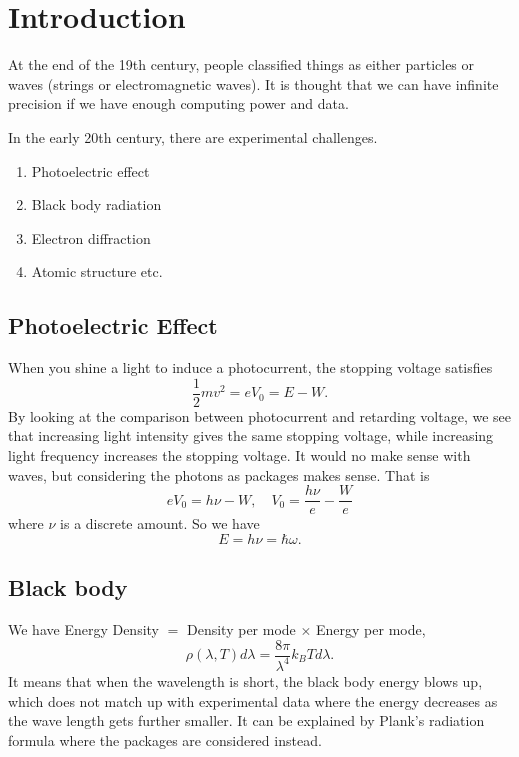 \section*{Introduction}
At the end of the 19th century, people classified things as either particles or waves (strings or electromagnetic waves). It is thought that we can have infinite precision if we have enough computing power and data.

In the early 20th century, there are experimental challenges.
\begin{enumerate}
    \item Photoelectric effect
    \item Black body radiation
    \item Electron diffraction
    \item Atomic structure etc.
\end{enumerate}

\subsection{Photoelectric Effect}
When you shine a light to induce a photocurrent, the stopping voltage satisfies
\[
    \frac{1}{2}m v^2 = eV_0= E - W.
\]
By looking at the comparison between photocurrent and retarding voltage, we see that increasing light intensity gives the same stopping voltage, while increasing light frequency increases the stopping voltage. It would no make sense with waves, but considering the photons as packages makes sense. That is
\[
    eV_0 = h\nu - W,\quad V_0 = \frac{h\nu}{e} - \frac{W}{e}
\]
where \(\nu\) is a discrete amount. So we have
\[
    E = h\nu = \hbar \omega.
\]

\subsection{Black body}
We have Energy Density \(=\) Density per mode \(\times\) Energy per mode,
\[
    \rho(\lambda,T)d\lambda = \frac{8\pi}{\lambda^4}k_B Td\lambda.
\]
It means that when the wavelength is short, the black body energy blows up, which does not match up with experimental data where the energy decreases as the wave length gets further smaller. It can be explained by Plank's radiation formula where the packages are considered instead.